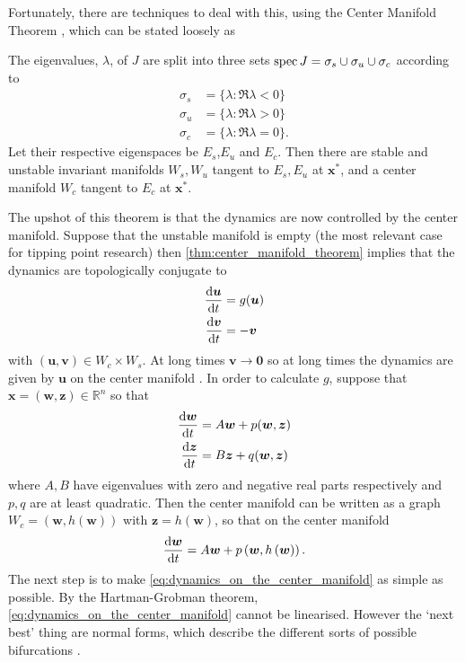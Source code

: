Fortunately, there are techniques to deal with this, using the Center Manifold Theorem \parencite{Morris1977}, which can be stated loosely as
\begin{theorem}
  \label{thm:center_manifold_theorem}
  The eigenvalues, $\lambda$, of $J$ are split into three sets $\operatorname{spec} J = \sigma_s \cup \sigma_u \cup \sigma_c$ according to
  \begin{align*}
    \sigma_s &= \{\lambda : \Re \lambda < 0\} \\
    \sigma_u &= \{\lambda : \Re \lambda > 0\} \\
    \sigma_c &= \{\lambda : \Re \lambda = 0\}.
  \end{align*}
  Let their respective eigenspaces be $E_s$,$E_u$ and $E_c$. Then there are stable and unstable invariant manifolds $W_s,W_u$ tangent to $E_s,E_u$ at $\bm{x}^{*}$,
  and a center manifold $W_c$ tangent to $E_c$ at $\bm{x}^*$.
\end{theorem}
The upshot of this theorem is that the dynamics are now controlled by the center manifold. Suppose that the unstable manifold is empty (the most relevant case for tipping point research)
then \cref{thm:center_manifold_theorem} implies that the dynamics are topologically conjugate to
\begin{subequations}
  \label{eq:center_manifold_topological_equivalence}
  \begin{align}
  \dv{\bm{u}}{t} &= g(\bm{u}) \\
  \dv{\bm{v}}{t} &= -\bm{v}
  \end{align}
\end{subequations}
with $(\bm{u},\bm{v}) \in W_c \times W_s$. At long times $\bm{v} \rightarrow \bm{0}$ so at long times the dynamics are given by $\bm{u}$ on the center manifold
\parencite{guckenheimer2013}. In order to calculate $g$, suppose that
$\bm{x} = (\bm{w},\bm{z}) \in \mathbb{R}^n$ so that
\begin{subequations}
  \label{eq:block_diagonal}
  \begin{align}
    \dv{\bm{w}}{t} &= A\bm{w} + p(\bm{w},\bm{z}) \\
    \dv{\bm{z}}{t} &= B\bm{z} + q(\bm{w},\bm{z})
  \end{align}
\end{subequations}
where $A,B$ have eigenvalues with zero and negative real parts respectively and $p,q$ are at least quadratic. Then the center manifold can be written as a graph $W_c = (\bm{w},h(\bm{w}))$
with $\bm{z} = h(\bm{w})$, so that on the center manifold
\begin{equation}
  \label{eq:dynamics_on_the_center_manifold}
  \dv{\bm{w}}{t} = A\bm{w} + p\left(\bm{w},h\left(\bm{w}\right)\right).
\end{equation}
The next step is to make \cref{eq:dynamics_on_the_center_manifold} as simple as possible. By the Hartman-Grobman theorem, \cref{eq:dynamics_on_the_center_manifold}
cannot be linearised. However the `next best' thing are normal forms, which describe the different sorts of possible bifurcations \parencite{Dijkstra2011}.

